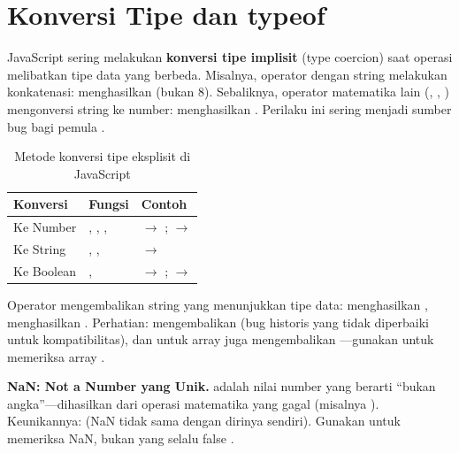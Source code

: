 ﻿\section{Konversi Tipe dan typeof}

JavaScript sering melakukan \textbf{konversi tipe implisit} (type coercion) saat operasi melibatkan tipe data yang berbeda. Misalnya, operator \code{+} dengan string melakukan konkatenasi:  menghasilkan  (bukan 8). Sebaliknya, operator matematika lain (\code{-}, \code{*}, \code{/}) mengonversi string ke number:  menghasilkan . Perilaku ini sering menjadi sumber bug bagi pemula \cite{jsInfo}.

\begin{table}[H]
\centering
\begin{tabular}{|P{3cm}|P{3.5cm}|P{5.5cm}|}
\hline
\textbf{Konversi} & \textbf{Fungsi} & \textbf{Contoh} \\
\hline
Ke Number & , , ,  &  $\rightarrow$ ;  $\rightarrow$  \\
\hline
Ke String & , ,  &  $\rightarrow$  \\
\hline
Ke Boolean & ,  &  $\rightarrow$ ;  $\rightarrow$  \\
\hline
\end{tabular}
\caption{Metode konversi tipe eksplisit di JavaScript}
\end{table}

Operator  mengembalikan string yang menunjukkan tipe data:  menghasilkan ,  menghasilkan . Perhatian:  mengembalikan  (bug historis yang tidak diperbaiki untuk kompatibilitas), dan  untuk array juga mengembalikan ---gunakan  untuk memeriksa array \cite{mdnJsGuide}.

\begin{konsep}
\textbf{NaN: Not a Number yang Unik.}  adalah nilai number yang berarti ``bukan angka''---dihasilkan dari operasi matematika yang gagal (misalnya ). Keunikannya:  (NaN tidak sama dengan dirinya sendiri). Gunakan  untuk memeriksa NaN, bukan  yang selalu false \cite{jsInfo}.
\end{konsep}

